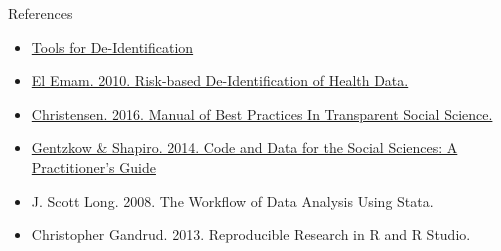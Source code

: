\documentclass[12pt, compress]{beamer} %
\let\olditem\item %
\renewcommand{\item}{%
\olditem\vspace{\fill}}
\begin{document}
\begin{frame}{References}
	\begin{itemize}
		\item \href{http://www.ehealthinformation.ca/wp-content/uploads/2014/08/2009-Tools-for-De-Identification-of-Personal-Health.pdf}{Tools for De-Identification}
		\item \href{http://www.ehealthinformation.ca/wp-content/uploads/2014/08/2010-Risk-based-de-identification-of-health-data.pdf}{El Emam. 2010. Risk-based De-Identification of Health Data.}
		\item \href{http://www.bitss.org/education/manual-of-best-practices/}{Christensen. 2016. Manual of Best Practices In Transparent Social Science.}
		\item \href{http://www.brown.edu/Research/Shapiro/pdfs/CodeAndData.pdf}{Gentzkow \& Shapiro. 2014. Code and Data for the Social Sciences: A Practitioner’s Guide}
		\item J. Scott Long. 2008. The Workflow of Data Analysis Using Stata.
		\item Christopher Gandrud. 2013. Reproducible Research in R and R Studio.
	\end{itemize} 
\end{frame}
\end{document}
